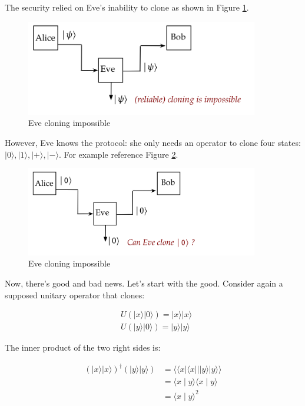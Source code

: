 \documentclass[main.tex]{subfiles}
\begin{document}
    The security relied on Eve's inability to clone as shown in Figure \ref{fig:24bb84}.
    
    \begin{figure}
        \centering
        \includegraphics[width=4in]{notes/figs/n07/24bb84.png}
        \caption{Eve cloning impossible}
        \label{fig:24bb84}
    \end{figure}
    
    However, Eve knows the protocol: she only needs an operator to clone four states: $|0\rangle,|1\rangle,|+\rangle,|-\rangle$. For example reference Figure \ref{fig:25bb84-2}.
    
    \begin{figure}
        \centering
        \includegraphics[width=4in]{notes/figs/n07/25bb84-2.png}
        \caption{Eve cloning impossible}
        \label{fig:25bb84-2}
    \end{figure}
    
    Now, there's good and bad news. Let's start with the good. Consider again a supposed unitary operator that clones:
   
    $$
    \begin{aligned}
    &U(|x\rangle|0\rangle)=|x\rangle|x\rangle \\
    &U(|y\rangle|0\rangle)=|y\rangle|y\rangle
    \end{aligned}
    $$
    
    The inner product of the two right sides is:
    
    $$
    \begin{aligned}
    (|x\rangle|x\rangle)^{\dagger}(|y\rangle|y\rangle) &=\langle\langle x|\langle x|| \mid y\rangle| y\rangle\rangle \\
    &=\langle x \mid y\rangle\langle x \mid y\rangle \\
    &=\langle x \mid y\rangle^{2}
    \end{aligned}
    $$
    
\end{document}
